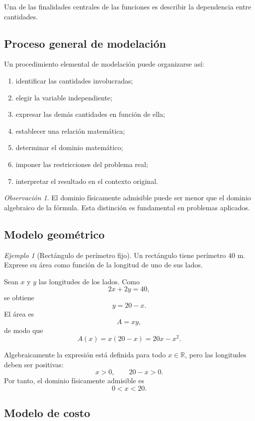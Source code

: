\documentclass[12pt]{article}
\theoremstyle{remark}
\newtheorem{observacion}{Observación}[section]
\newtheorem{ejemplo}{Ejemplo}[section]
\newcommand{\R}{\mathbb{R}}
\begin{document}
Una de las finalidades centrales de las funciones es describir la dependencia
entre cantidades.

\subsection{Proceso general de modelación}

Un procedimiento elemental de modelación puede organizarse así:

\begin{enumerate}
    \item identificar las cantidades involucradas;
    \item elegir la variable independiente;
    \item expresar las demás cantidades en función de ella;
    \item establecer una relación matemática;
    \item determinar el dominio matemático;
    \item imponer las restricciones del problema real;
    \item interpretar el resultado en el contexto original.
\end{enumerate}

\begin{observacion}
El dominio físicamente admisible puede ser menor que el dominio algebraico de
la fórmula. Esta distinción es fundamental en problemas aplicados.
\end{observacion}

\subsection{Modelo geométrico}

\begin{ejemplo}[Rectángulo de perímetro fijo]
Un rectángulo tiene perímetro $40$ m. Exprese su área como función de la
longitud de uno de sus lados.

Sean $x$ y $y$ las longitudes de los lados. Como
\[
2x+2y=40,
\]
se obtiene
\[
y=20-x.
\]
El área es
\[
A=xy,
\]
de modo que
\[
A(x)=x(20-x)=20x-x^2.
\]

Algebraicamente la expresión está definida para todo $x\in\R$, pero las
longitudes deben ser positivas:
\[
x>0,\qquad20-x>0.
\]
Por tanto, el dominio físicamente admisible es
\[
0<x<20.
\]
\end{ejemplo}

\subsection{Modelo de costo}
\end{document}

